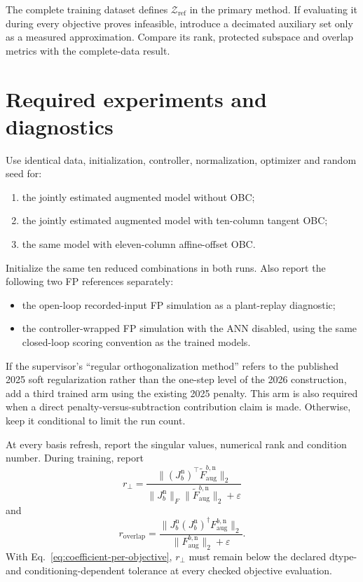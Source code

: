 \documentclass[11pt,a4paper]{article}
\begin{document}
The complete training dataset defines \(\mathcal Z_{\mathrm{ref}}\) in the
primary method. If evaluating it during every objective proves infeasible,
introduce a decimated auxiliary set only as a measured approximation. Compare
its rank, protected subspace and overlap metrics with the complete-data result.

\section{Required experiments and diagnostics}

Use identical data, initialization, controller, normalization, optimizer and
random seed for:
\begin{enumerate}
    \item the jointly estimated augmented model without OBC;
    \item the jointly estimated augmented model with ten-column tangent OBC;
    \item the same model with eleven-column affine-offset OBC.
\end{enumerate}
Initialize the same ten reduced combinations in both runs. Also report the
following two FP references separately:
\begin{itemize}
    \item the open-loop recorded-input FP simulation as a plant-replay
          diagnostic;
    \item the controller-wrapped FP simulation with the ANN disabled, using
          the same closed-loop scoring convention as the trained models.
\end{itemize}
If the supervisor's ``regular orthogonalization method'' refers to the
published 2025 soft regularization rather than the one-step level of the 2026
construction, add a third trained arm using the existing 2025 penalty. This
arm is also required when a direct penalty-versus-subtraction contribution
claim is made. Otherwise, keep it conditional to limit the run count.

At every basis refresh, report the singular values, numerical rank and
condition number. During training, report
\begin{equation}
    r_\perp=
    \frac{\|(J_b^{\mathrm n})^\top
    \widetilde F_{\mathrm{aug}}^{b,\mathrm n}\|_2}
    {\|J_b^{\mathrm n}\|_F
     \|\widetilde F_{\mathrm{aug}}^{b,\mathrm n}\|_2+\varepsilon}
\end{equation}
and
\begin{equation}
    r_{\mathrm{overlap}}
    =\frac{\|J_b^{\mathrm n}(J_b^{\mathrm n})^\dagger
    F_{\mathrm{aug}}^{b,\mathrm n}\|_2}
    {\|F_{\mathrm{aug}}^{b,\mathrm n}\|_2+\varepsilon}.
\end{equation}
With Eq.~\eqref{eq:coefficient-per-objective}, \(r_\perp\) must remain below
the declared dtype- and conditioning-dependent tolerance at every checked
objective evaluation.
\end{document}
